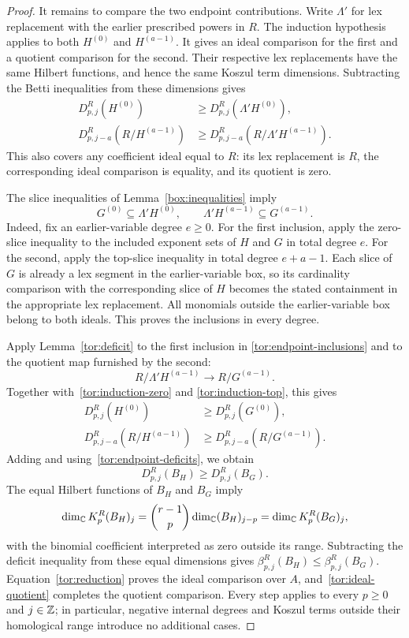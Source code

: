 \begin{proof}


It remains to compare the two endpoint contributions.  Write
$\Lambda'$ for lex replacement with the earlier prescribed powers
in $R$.  The induction hypothesis applies to both $H^{(0)}$ and
$H^{(a-1)}$.  It gives an ideal comparison for the first and a
quotient comparison for the second.  Their respective lex
replacements have the same Hilbert functions, and hence the same
Koszul term dimensions.  Subtracting the Betti inequalities from
these dimensions gives
\begin{align}
 D^R_{p,j}(H^{(0)})
       &\ge D^R_{p,j}(\Lambda'H^{(0)}),
       \label{tor:induction-zero}\\
 D^R_{p,j-a}(R/H^{(a-1)})
       &\ge D^R_{p,j-a}(R/\Lambda'H^{(a-1)}).
       \label{tor:induction-top}
\end{align}
This also covers any coefficient ideal equal to $R$: its lex
replacement is $R$, the corresponding ideal comparison is equality,
and its quotient is zero.

The slice inequalities of Lemma~\ref{box:inequalities} imply
\begin{equation}
\label{tor:endpoint-inclusions}
 G^{(0)}\subseteq\Lambda'H^{(0)},\qquad
 \Lambda'H^{(a-1)}\subseteq G^{(a-1)}.
\end{equation}
Indeed, fix an earlier-variable degree $e\ge0$.  For the first
inclusion, apply the zero-slice inequality to the included exponent
sets of $H$ and $G$ in total degree $e$.  For the second, apply
the top-slice inequality in total degree $e+a-1$.  Each slice of
$G$ is already a lex segment in the earlier-variable box, so its
cardinality comparison with the corresponding slice of $H$ becomes
the stated containment in the appropriate lex replacement.
All monomials outside the earlier-variable box belong to both ideals.
This proves the inclusions in every degree.

Apply Lemma~\ref{tor:deficit} to the first inclusion in
\eqref{tor:endpoint-inclusions} and to the quotient map furnished
by the second:
\[
 R/\Lambda'H^{(a-1)}\longrightarrow R/G^{(a-1)}.
\]
Together with~\eqref{tor:induction-zero} and
\eqref{tor:induction-top}, this gives
\begin{align*}
 D^R_{p,j}(H^{(0)})&\ge D^R_{p,j}(G^{(0)}),\\
 D^R_{p,j-a}(R/H^{(a-1)})
       &\ge D^R_{p,j-a}(R/G^{(a-1)}).
\end{align*}
Adding and using~\eqref{tor:endpoint-deficits}, we obtain
\[
 D^R_{p,j}(B_H)\ge D^R_{p,j}(B_G).
\]
The equal Hilbert functions of $B_H$ and $B_G$ imply
\[
 \dim_\mathbb C K^R_p(B_H)_j
    =\binom{r-1}{p}\dim_\mathbb C(B_H)_{j-p}
    =\dim_\mathbb C K^R_p(B_G)_j,
\]
with the binomial coefficient interpreted as zero outside its range.
Subtracting the deficit inequality from these equal dimensions gives
$\beta^R_{p,j}(B_H)\le\beta^R_{p,j}(B_G)$.
Equation~\eqref{tor:reduction} proves the ideal comparison over $A$,
and~\eqref{tor:ideal-quotient} completes the quotient comparison.
Every step applies to every $p\ge0$ and $j\in\mathbb Z$; in particular,
negative internal degrees and Koszul terms outside their homological
range introduce no additional cases.
\end{proof}
